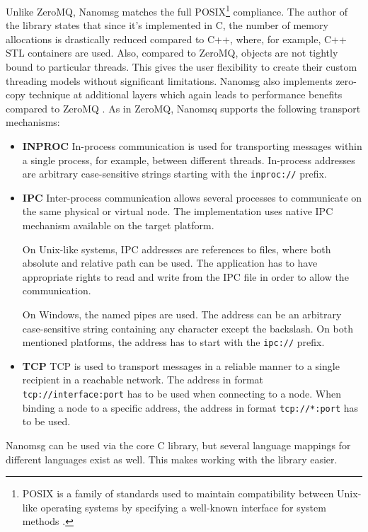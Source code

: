 Unlike ZeroMQ, Nanomsg matches the full POSIX\footnote{POSIX is a family of standards used to maintain compatibility between Unix-like operating systems by specifying a well-known interface for system methods \cite{POSIX}. } compliance. The author of the library states that since it's implemented in C, the number of memory allocations is drastically reduced compared to C++, where, for example, C++ STL containers are used. Also, compared to ZeroMQ, objects are not tightly bound to particular threads. This gives the user flexibility to create their custom threading models without significant limitations. Nanomsg also implements zero-copy technique at additional layers which again leads to performance benefits compared to ZeroMQ \cite{Nanomsg_Diff}. As in ZeroMQ, Nanomsq supports the following transport mechanisms:
\begin{itemize}
	\item \textbf{INPROC} \newline
	In-process communication is used for transporting messages within a single process, for example, between different threads. In-process addresses are arbitrary case-sensitive strings starting with the \texttt{inproc://} prefix.
	\item \textbf{IPC}  \newline 
	Inter-process communication allows several processes to communicate on the same physical or virtual node. The implementation uses native IPC mechanism available on the target platform. 
	
	On Unix-like systems, IPC addresses are references to files, where both absolute and relative path can be used. The application has to have appropriate rights to read and write from the IPC file in order to allow the communication.
	
	 On Windows, the named pipes are used. The address can be an arbitrary case-sensitive string containing any character except the backslash. On both mentioned platforms, the address has to start with the \texttt{ipc://} prefix.
	\item \textbf{TCP} \newline
	TCP is used to transport messages in a reliable manner to a single recipient in a reachable network. The address in format \texttt{tcp://interface:port} has to be used when connecting to a node. When binding a node to a specific address, the address in format \texttt{tcp://*:port} has to be used.
\end{itemize}

Nanomsg can be used via the core C library, but several language mappings for different languages exist as well. This makes working with the library easier.
